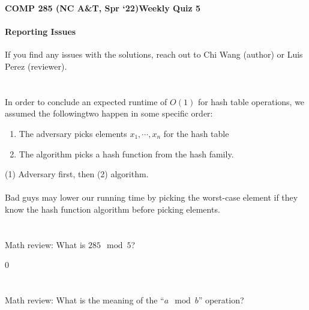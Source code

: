 \documentclass [12pt]{article}
\begin{document}
 

{\LARGE \textbf {COMP 285 (NC A\&T, Spr `22)}\hfill \textbf {Weekly Quiz 5} } 

\begin{Instruction}

\paragraph{Reporting Issues} If you find any issues with the solutions, reach out to Chi Wang (author) or Luis Perez (reviewer).

\end{Instruction}


\section{} In order to conclude an expected runtime of $O(1)$ for hash table operations, we assumed the followingtwo happen in some specific order: 
\begin{enumerate}
    \item The adversary picks elements $x_1, \cdots , x_n$ for the hash table
    \item The algorithm picks a hash function from the hash family.
\end{enumerate}

\begin{Solution}
(1) Adversary first, then (2) algorithm.
\paragraph{}

Bad guys may lower our running time by picking the worst-case element if they know the hash function algorithm before picking elements. 
\end{Solution}


\section{} Math review: What is $285 \mod 5$?

\begin{Solution}
0
\end{Solution}


\section{} Math review: What is the meaning of the ``$a \mod b$'' operation?
\end{document}
